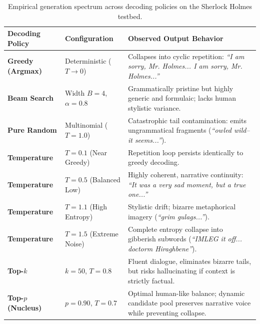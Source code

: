 \documentclass[../../main.tex]{subfiles}
\begin{document}
\begin{table}[htbp]
\centering
\small
\caption{Empirical generation spectrum across decoding policies on the Sherlock Holmes testbed.}
\label{tab:sherlock_generation_spectrum}
\begin{tabularx}{\textwidth}{lp{4.2cm}X}
\toprule
\textbf{Decoding Policy} & \textbf{Configuration} & \textbf{Observed Output Behavior} \\
\midrule
\textbf{Greedy (Argmax)} & Deterministic ($T \to 0$) & Collapses into cyclic repetition: \emph{``I am sorry, Mr. Holmes... I am sorry, Mr. Holmes...''} \\
\addlinespace
\textbf{Beam Search} & Width $B=4$, $\alpha=0.8$ & Grammatically pristine but highly generic and formulaic; lacks human stylistic variance. \\
\addlinespace
\textbf{Pure Random} & Multinomial ($T=1.0$) & Catastrophic tail contamination: emits ungrammatical fragments (\emph{``owled wild--it seems...''}). \\
\addlinespace
\textbf{Temperature} & $T = 0.1$ (Near Greedy) & Repetition loop persists identically to greedy decoding. \\
\addlinespace
\textbf{Temperature} & $T = 0.5$ (Balanced Low) & Highly coherent, narrative continuity: \emph{``It was a very sad moment, but a true one...''} \\
\addlinespace
\textbf{Temperature} & $T = 1.1$ (High Entropy) & Stylistic drift; bizarre metaphorical imagery (\emph{``grim gulags...''}). \\
\addlinespace
\textbf{Temperature} & $T = 1.5$ (Extreme Noise) & Complete entropy collapse into gibberish subwords (\emph{``IMLEG it off... doctorm Hiraghbene''}). \\
\addlinespace
\textbf{Top-$k$} & $k = 50$, $T=0.8$ & Fluent dialogue, eliminates bizarre tails, but risks hallucinating if context is strictly factual. \\
\addlinespace
\textbf{Top-$p$ (Nucleus)} & $p = 0.90$, $T=0.7$ & Optimal human-like balance; dynamic candidate pool preserves narrative voice while preventing collapse. \\
\bottomrule
\end{tabularx}
\end{table}
\end{document}
